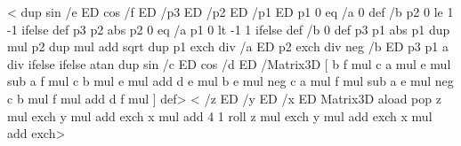 %
%
<%
  dup sin /e ED cos /f ED
  /p3 ED /p2 ED /p1 ED
  p1 0 eq
  { /a 0 def /b p2 0 le { 1 } { -1 } ifelse def
    p3 p2 abs
  }
  { p2 0 eq
    { /a p1 0 lt { -1 } { 1 } ifelse def /b 0 def
      p3 p1 abs
    }
    { p1 dup mul p2 dup mul add sqrt dup
      p1 exch div /a ED
      p2 exch div neg /b ED
      p3 p1 a div
    }
    ifelse
  }
  ifelse
  atan dup sin /c ED cos /d ED
  /Matrix3D
  [
    b f mul c a mul e mul sub
    a f mul c b mul e mul add
    d e mul
    b e mul neg c a mul f mul sub
    a e mul neg c b mul f mul add
    d f mul
  ] def>
%
%
<%
  /z ED /y ED /x ED
  Matrix3D aload pop
  z mul exch y mul add exch x mul add
  4 1 roll
  z mul exch y mul add exch x mul add
  exch>
%
